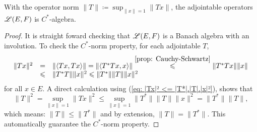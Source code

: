 \begin{proposicao}
    With the operator norm $\|T\| \coloneqq \sup_{\|x\|=1} \|Tx\|$, the adjointable operators $\mathscr L(E,F)$ is $C^*$-algebra.
    \begin{proof}
    It is straight foward checking that $\mathscr L(E,F)$ is a Banach algebra with an involution. To check the $C^*$-norm property, for each adjointable $T$,
    \begin{equation}
    \label{eq: |Tx|² <= |T*|.|T|.|x|²}
        \begin{array}{rcl}
            \|Tx\|^2 &=& \|\langle {Tx},{Tx}\rangle\| = \|\langle {T^*Tx},{x}\rangle\| \overset{\ref{prop: Cauchy-Schwartz}}{\leqslant} \|T^*Tx\|\|x\| \\
            &\leqslant & \|T^*T\|\|x\|^2 \leqslant \|T^*\|\|T\| \|x\|^2 
        \end{array}
    \end{equation}
    for all $x\in E$. A direct calculation using (\ref{eq: |Tx|² <= |T*|.|T|.|x|²}), shows that
    \[
    \|T\|^2 = \sup_{\|x\|=1} \|Tx\|^2 \leq \sup_{\|x\|=1} \|T^*\|\|T\|\|x\|^2 = \|T^*\|\|T\|,
    \]
    which means: $\|T\| \leq \|T^*\|$ and by extension, $\|T\|=\|T^*\|$. This automatically guarantee the $C^*$-norm property.
    \end{proof}
\end{proposicao}
    
